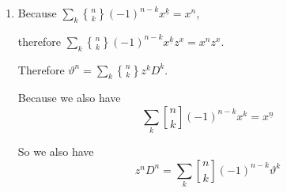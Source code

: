 \documentclass[12pt,a4paper]{article}
\makeatletter
\newtheorem*{solution}{Solution}
\theoremstyle{definition}
\renewenvironment{solution}[1][Solution] {\par\pushQED{\qed}\normalfont\topsep6\p@\@plus6\p@\relax\trivlist\item[\hskip\labelsep\bfseries#1\@addpunct{.}]\ignorespaces}{\popQED\endtrivlist\@endpefalse} \makeatother
\makeatother
\begin{document}
\begin{enumerate}
\begin{solution}
        	Because $\sum_k {n \brace k} (-1)^{n-k} x^{\underline{k}}=x^n$,
        	
        	therefore $\sum_k {n \brace k} (-1)^{n-k} x^{\underline{k}} z^x=x^n z^x$.
        	
        	Therefore $\vartheta^n=\sum_k {n\brace k} z^kD^k$.
        	
        	Because we also have 
        	\begin{equation*}
        	    \sum_k {n \brack k}(-1)^{n-k} x^k=x^{\underline{n}}
        	\end{equation*}
        	
        	So we also have
        	\begin{equation*}
        	    z^nD^n=\sum_k{ n \brack k} (-1)^{n-k} \vartheta^k
        	\end{equation*}
        \end{solution}
   
\end{enumerate}

\end{document}
